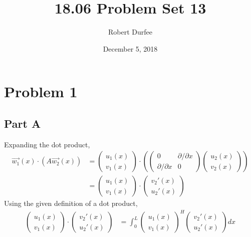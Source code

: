 \documentclass{article}
\title{18.06 Problem Set 13}
\author{Robert Durfee}
\date{December 5, 2018}
\begin{document}
\maketitle

\section*{Problem 1}

\subsection*{Part A}

Expanding the dot product,
\begin{align*}
  \vec{w_1}(x) \cdot \left(A \vec{w_2}(x)\right)&= \begin{pmatrix}
  u_1(x) \\
  v_1(x)
\end{pmatrix} \cdot \left(\begin{pmatrix}
  0 & \partial / \partial x \\
  \partial / \partial x & 0
\end{pmatrix} \begin{pmatrix}
  u_2(x) \\
  v_2(x)
\end{pmatrix}\right) \\
&= \begin{pmatrix}
  u_1(x) \\
  v_1(x)
\end{pmatrix} \cdot \begin{pmatrix}
  v_2'(x) \\
  u_2'(x)
\end{pmatrix}
\end{align*}
Using the given definition of a dot product,
\begin{align*}
  \begin{pmatrix}
    u_1(x) \\
    v_1(x)
  \end{pmatrix} \cdot \begin{pmatrix}
    v_2'(x) \\
    u_2'(x)
  \end{pmatrix} &= \int_0^L \begin{pmatrix}
    u_1(x) \\
    v_1(x)
  \end{pmatrix}^H \begin{pmatrix}
    v_2'(x) \\
    u_2'(x)
  \end{pmatrix} dx
\end{align*}
\end{document}
